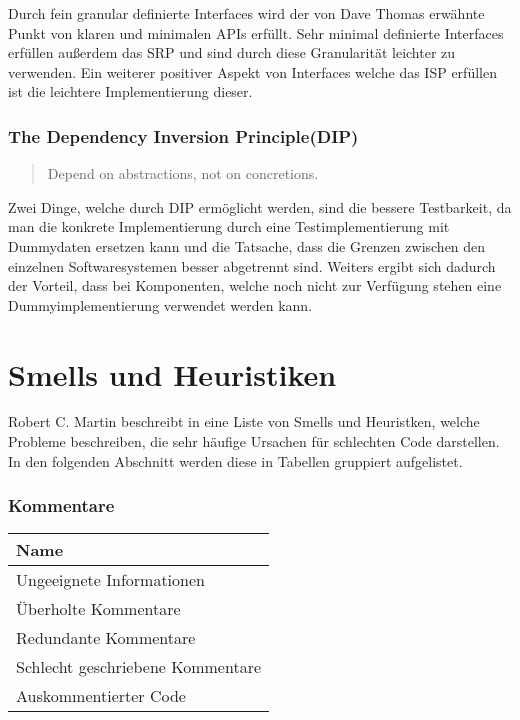 Durch fein granular definierte Interfaces wird der von Dave Thomas erwähnte Punkt von klaren und minimalen APIs erfüllt. Sehr minimal definierte Interfaces erfüllen außerdem das SRP und sind durch diese Granularität leichter zu verwenden. Ein weiterer positiver Aspekt von Interfaces welche das ISP erfüllen ist die leichtere Implementierung dieser.

\subsubsection{The Dependency Inversion Principle(DIP)}
\begin{quotation}
	Depend on abstractions, not on concretions.
\end{quotation}

Zwei Dinge, welche durch DIP ermöglicht werden, sind die bessere Testbarkeit, da man die konkrete Implementierung durch eine Testimplementierung mit Dummydaten ersetzen kann und die Tatsache, dass die Grenzen zwischen den einzelnen Softwaresystemen besser abgetrennt sind. Weiters ergibt sich dadurch der Vorteil, dass bei Komponenten, welche noch nicht zur Verfügung stehen eine Dummyimplementierung verwendet werden kann. 

\section{Smells und Heuristiken}
Robert C. Martin beschreibt in \cite{Martin2008} eine Liste von Smells und Heuristken, welche Probleme beschreiben, die sehr häufige Ursachen für schlechten Code darstellen. In den folgenden Abschnitt werden diese in Tabellen gruppiert aufgelistet. 

\subsubsection{Kommentare}

\begin{table}[H]
	\centering
		 \begin{tabular}{ | l | }
		 \hline
			Name \\  \hline
			Ungeeignete Informationen\\
			Überholte Kommentare  \\
			Redundante Kommentare \\
			Schlecht geschriebene Kommentare  \\
			Auskommentierter Code \\ \hline
		\end{tabular}
	\label{tab:SmellsUndHeuristiken_Comments}
\end{table}

